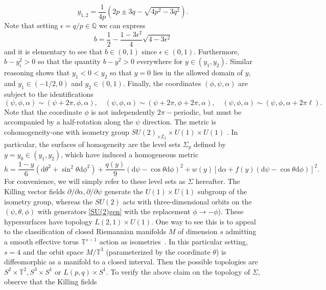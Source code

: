 \documentclass[11pt]{amsart}
\theoremstyle{plain}
\newcommand{\td}{\text{d}}
\theoremstyle{definition}
\numberwithin{equation}{section}
\begin{document}
\begin{equation}
    y_{1,2} = \frac{1}{4p} \left( 2p \pm 3q - \sqrt{4p^2 - 3 q^2} \right).
\end{equation} Note that setting $\epsilon = q/p \in \mathbb{Q}$ we can express
\begin{equation}\label{bpq}
    b = \frac{1}{2} - \frac{1 - 3 \epsilon^2}{4} \sqrt{4 - 3\epsilon^2}
\end{equation} and it is elementary to see that $b \in (0,1)$ since $\epsilon \in (0,1)$. Furthermore, $b - y_i^2 > 0$ so that the quantity $b - y^2 > 0$ everywhere for $y \in (y_1,y_2)$. Similar reasoning shows that 
$y_1 < 0 < y_2$ so that $y=0$ lies in the allowed domain of $y$, and $y_1 \in (-1/2,0)$ and $y_2 \in (0,1)$. Finally, the coordinates $(\phi,\psi,\alpha)$ are subject to the identifications 
\begin{equation}\label{ident}
(\psi,\phi,\alpha) \sim (\psi + 2\pi, \phi, \alpha), \quad (\psi,\phi,\alpha) \sim (\psi + 2\pi, \phi + 2\pi, \alpha), \quad  (\psi,\phi,\alpha) \sim (\psi, \phi, \alpha + 2\pi \ell).
\end{equation} Note that the coordinate $\phi$ is not independently $2\pi-$periodic, but must be accompanied by a half-rotation along the $\psi$ direction. The metric is cohomogeneity-one with isometry group $SU(2)_{\times \mathbb{Z}_2} \times U(1) \times U(1)$ \cite{Gauntlett:2004yd}. In particular, the surfaces of homogeneity are the level sets $\Sigma_y$ defined by $y= y_0 \in (y_1, y_2)$, which have induced a homogeneous metric
\begin{equation}
     h = \frac{1-y}{6} (\td \theta^2 + \sin^2\theta \td \phi^2) + \frac{q(y)}{9} (\td \psi - \cos\theta \td \phi)^2 + w(y) \left[ \td \alpha + f(y)(\td \psi - \cos\theta \td \phi)\right]^2.
\end{equation} For convenience, we will simply refer to these level sets as $\Sigma$ hereafter. The Killing vector fields $\partial/ \partial \alpha, \partial / \partial \psi$ generate the $U(1) \times U(1)$ subgroup of the isometry group, whereas the $SU(2)$ acts with three-dimensional orbits on the $(\psi,\theta,\phi)$ with generators \eqref{SU(2)gen} with the replacement $\phi \to -\phi$). These  hypersurfaces have topology $L(2,1) \times U(1)$. One way to see this is to appeal to the classification of closed Riemannian manifolds $M$ of dimension $s$ admitting a smooth effective torus $\mathbb{T}^{s-1}$ action as isometries~\cite[Theorem 2]{Hollands}. In this particular setting, $s=4$ and the orbit space $M / \mathbb{T}^3$ (parameterized by the coordinate $\theta$) is diffeomorphic as a manifold to a closed interval.  Then the possible topologies are $S^2 \times \mathbb{T}^2, S^3 \times S^1$ or $L(p,q) \times S^1$. To verify the above claim on the topology of $\Sigma$, observe that the Killing fields 
\end{document}
